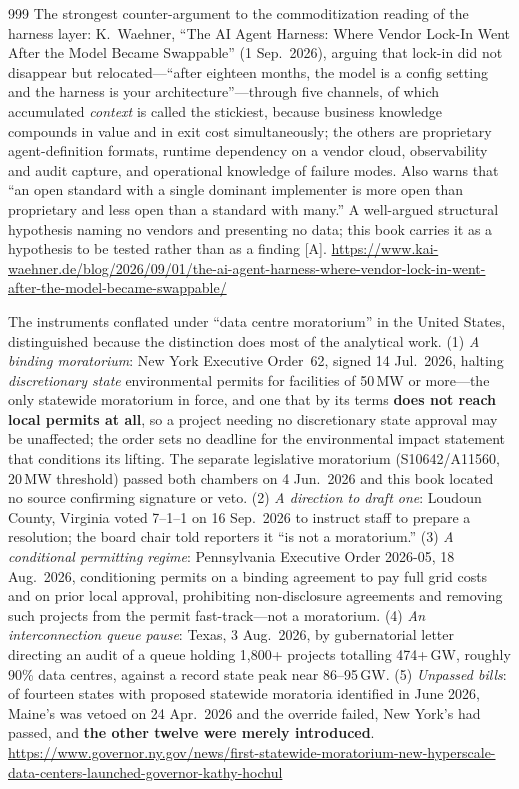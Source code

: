 \begin{thebibliography}{999}
 The strongest counter-argument to the commoditization reading of the harness layer: K.~Waehner, ``The AI Agent Harness: Where Vendor Lock-In Went After the Model Became Swappable'' (1 Sep.\ 2026), arguing that lock-in did not disappear but relocated---``after eighteen months, the model is a config setting and the harness is your architecture''---through five channels, of which accumulated \emph{context} is called the stickiest, because business knowledge compounds in value and in exit cost simultaneously; the others are proprietary agent-definition formats, runtime dependency on a vendor cloud, observability and audit capture, and operational knowledge of failure modes. Also warns that ``an open standard with a single dominant implementer is more open than proprietary and less open than a standard with many.'' A well-argued structural hypothesis naming no vendors and presenting no data; this book carries it as a hypothesis to be tested rather than as a finding [A]. \url{https://www.kai-waehner.de/blog/2026/09/01/the-ai-agent-harness-where-vendor-lock-in-went-after-the-model-became-swappable/}

 The instruments conflated under ``data centre moratorium'' in the United States, distinguished because the distinction does most of the analytical work. (1) \emph{A binding moratorium}: New York Executive Order~62, signed 14 Jul.\ 2026, halting \emph{discretionary state} environmental permits for facilities of 50\,MW or more---the only statewide moratorium in force, and one that by its terms \textbf{does not reach local permits at all}, so a project needing no discretionary state approval may be unaffected; the order sets no deadline for the environmental impact statement that conditions its lifting. The separate legislative moratorium (S10642/A11560, 20\,MW threshold) passed both chambers on 4 Jun.\ 2026 and this book located no source confirming signature or veto. (2) \emph{A direction to draft one}: Loudoun County, Virginia voted 7--1--1 on 16 Sep.\ 2026 to instruct staff to prepare a resolution; the board chair told reporters it ``is not a moratorium.'' (3) \emph{A conditional permitting regime}: Pennsylvania Executive Order 2026-05, 18 Aug.\ 2026, conditioning permits on a binding agreement to pay full grid costs and on prior local approval, prohibiting non-disclosure agreements and removing such projects from the permit fast-track---not a moratorium. (4) \emph{An interconnection queue pause}: Texas, 3 Aug.\ 2026, by gubernatorial letter directing an audit of a queue holding 1,800+ projects totalling 474+\,GW, roughly 90\% data centres, against a record state peak near 86--95\,GW. (5) \emph{Unpassed bills}: of fourteen states with proposed statewide moratoria identified in June 2026, Maine's was vetoed on 24 Apr.\ 2026 and the override failed, New York's had passed, and \textbf{the other twelve were merely introduced}. \url{https://www.governor.ny.gov/news/first-statewide-moratorium-new-hyperscale-data-centers-launched-governor-kathy-hochul}


\end{thebibliography}
